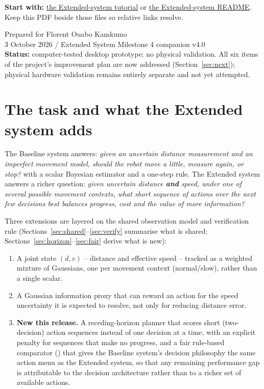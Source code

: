\documentclass[11pt,a4paper]{article}
\newcommand{\code}[1]{\texttt{\detokenize{#1}}}
\begin{document}
\begin{titlepage}
\textbf{Start with:} \href{Tutorial_EXT1_EN.pdf}{the Extended-system tutorial} or \href{README.md}{the Extended-system README}. Keep this PDF beside those files so relative links resolve.

\vfill
Prepared for Florent Ouabo Kamkumo\\
3 October 2026 / Extended System Milestone 4 companion v4.0\\
\textbf{Status:} computer-tested desktop prototype; no physical validation. All six
items of the project's improvement plan are now addressed (Section~\ref{sec:next});
physical hardware validation remains entirely separate and not yet attempted.
\end{titlepage}
\tableofcontents
\newpage

\section{The task and what the Extended system adds}
The Baseline system answers: \emph{given an uncertain distance measurement and an imperfect movement model, should the robot move a little, measure again, or stop?} with a scalar Bayesian estimator and a one-step rule. The Extended system answers a richer question: \emph{given uncertain distance \textbf{and} speed, under one of several possible movement contexts, what short sequence of actions over the next few decisions best balances progress, cost and the value of more information?}

Three extensions are layered on the shared observation model and verification rule (Sections~\ref{sec:shared}--\ref{sec:verify} summarise what is shared; Sections~\ref{sec:horizon}--\ref{sec:fair} derive what is new):
\begin{enumerate}
\item A joint state $(d,v)$ -- distance and effective speed -- tracked as a weighted mixture of Gaussians, one per movement context (normal/slow), rather than a single scalar.
\item A Gaussian information proxy that can reward an action for the speed uncertainty it is expected to resolve, not only for reducing distance error.
\item \textbf{New this release.} A receding-horizon planner that scores short (two-decision) action sequences instead of one decision at a time, with an explicit penalty for sequences that make no progress, and a fair rule-based comparator (\code{FairRuleBaseline}) that gives the Baseline system's decision philosophy the same action menu as the Extended system, so that any remaining performance gap is attributable to the decision architecture rather than to a richer set of available actions.
\end{enumerate}
\end{document}

